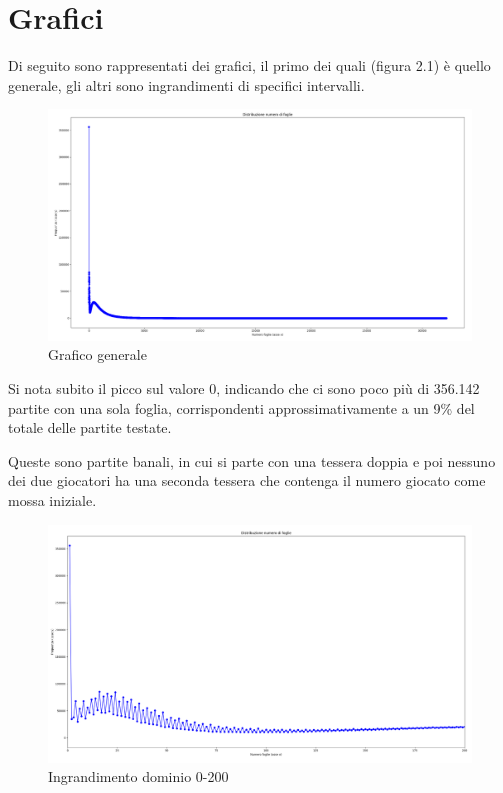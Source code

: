 \documentclass[a4paper,12pt]{report} %
\begin{document}
\section{Grafici}

Di seguito sono rappresentati dei grafici, il primo dei quali (figura 2.1) è quello generale, gli altri sono ingrandimenti di specifici intervalli.


\begin{figure}[h!]
    \centering
    \includegraphics[width=1\textwidth]{imgs/grafico_base.png} %
    \caption{Grafico generale}
    \label{fig:etichetta}
\end{figure}

Si nota subito il picco sul valore 0, indicando che ci sono poco più di 356.142 partite con una sola foglia, corrispondenti approssimativamente a un 9\% del totale delle partite testate.

Queste sono partite banali, in cui si parte con una tessera doppia e poi nessuno dei due giocatori ha una seconda tessera che contenga il numero giocato come mossa iniziale.

\begin{figure}[h!]
    \centering
    \includegraphics[width=1\textwidth]{imgs/grafico_0_200.png} %
    \caption{Ingrandimento dominio 0-200}
    \label{fig:etichetta}
\end{figure}
\end{document}
